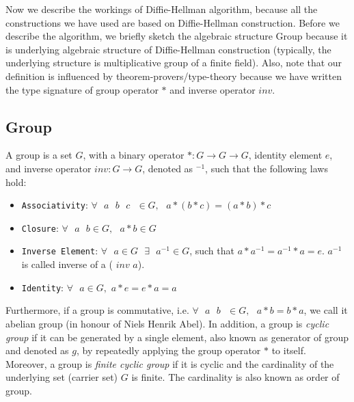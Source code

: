   
    
    Now we  describe the workings of Diffie-Hellman \citep{Diffie:2006:NDC:2263321.2269104}
    algorithm, because all the constructions we have used  are based on Diffie-Hellman construction. 
    Before we describe the algorithm, we briefly sketch the algebraic structure Group because it is underlying algebraic structure of 
    Diffie-Hellman  construction  (typically, the underlying 
    structure is multiplicative group of a finite field). Also, note that our definition is influenced by theorem-provers/type-theory because 
    we have  written the type signature of group operator $*$ and inverse operator $inv$. 
    
    \subsection{Group}
    \label{sec:group}
    A group is a set $G$, with a binary operator $* : G \rightarrow G \rightarrow G$, identity element $e$, and inverse operator $inv : G \rightarrow G$, denoted as $^{-1}$, such 
    that the following laws hold: 
    \begin{itemize}
     \item \texttt{Associativity}: $\forall \text{  } a \text{  } b  \text{  } c \text{  } \in G,  \text{  } a * (b * c) = (a * b) * c$
    \item \texttt{Closure}: $\forall \text{  } a \text{  } b \in G,  \text{  } a * b \in G$
    \item \texttt{Inverse Element}: $\forall \text{  } a \in G \text{  } \exists \text{  } a^{-1} \in G$, such that $a * a^{-1} = a^{-1} * a = e$. $a^{-1}$ is called inverse of a (
     $inv$ $a$).
    \item \texttt{Identity}: $\forall \text{  } a \in G,$  $a * e = e * a  = a$
    \end{itemize}
   
    \noindent
    Furthermore, if a group is commutative, i.e. 
    $\forall \text{  } a \text{  } b \text{  } \in  G,  \text{  } a * b = b * a$,  we call it abelian group (in honour of Niels Henrik Abel). In addition, 
    a group is \textit{cyclic group} if it can be generated by a single element, also known as generator of group 
    and denoted as $g$, by repeatedly applying the group operator $*$ to itself. Moreover, a group is \textit{finite cyclic group}
    if it is cyclic and the cardinality of the underlying set (carrier set) $G$ is finite. The cardinality is also known as order of group. 
	    
